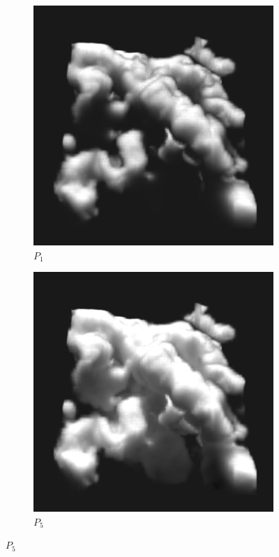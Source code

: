 \begin{figure}[h]
\begin{subfigure}[t]{0.48\columnwidth}
\includegraphics[width=\columnwidth]{04_pn_method/results/nebulae_p1_ms.png}
\caption{$P_1$}
\label{fig:pn_results_nebulae1_P3}
\end{subfigure}%
\hspace{0.01\columnwidth}
\begin{subfigure}[t]{0.48\columnwidth}
\includegraphics[width=\columnwidth]{04_pn_method/results/nebulae_p5_ms.png}
\caption{$P_5$}
\label{fig:pn_results_nebulae1_P5}
\end{subfigure}


\end{figure}
